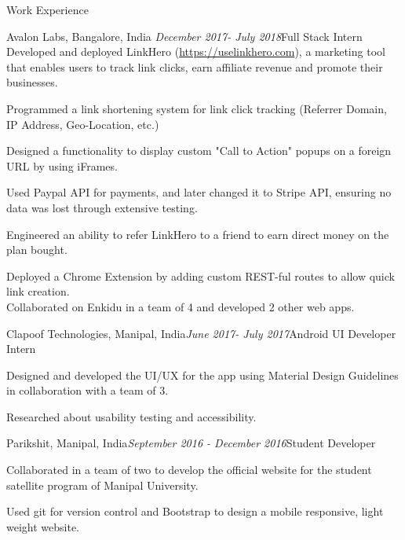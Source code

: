 \documentclass{resume} %
\begin{document}
\begin{rSection}{Work Experience}

    \begin{rSubsection}{Avalon Labs, Bangalore, India }{\em December 2017- July 2018}{Full Stack Intern}{}
    Developed and deployed LinkHero (\url{https://uselinkhero.com}), a marketing tool that enables users to track link clicks, earn affiliate revenue and promote their businesses.
    \item
    Programmed a link shortening system for link click tracking (Referrer Domain, IP Address, Geo-Location, etc.)
    \item 
    Designed a functionality to display custom "Call to Action" popups on a foreign URL by using iFrames.
    \item 
    Used Paypal API for payments, and later changed it to Stripe API, ensuring no data was lost through extensive testing.
    \item 
    Engineered an ability to refer LinkHero to a friend to earn direct money on the plan bought. 
    \item
    Deployed a Chrome Extension by adding custom REST-ful routes to allow quick link creation.\\
    Collaborated on Enkidu in a team of 4 and developed 2 other web apps.
    \end{rSubsection}
    
    \begin{rSubsection}{Clapoof Technologies, Manipal, India}{\em June 2017- July 2017}{Android UI Developer Intern}{}
    \item Designed and developed the UI/UX for the app using Material Design Guidelines in collaboration with a team of 3.
    \item Researched about usability testing and accessibility.
    \end{rSubsection}
    
    \begin{rSubsection}{Parikshit, Manipal, India}{\em September 2016 - December 2016}{Student Developer}{}
    \item Collaborated in a team of two to develop the official website for the student satellite program of Manipal University.
    \item Used git for version control and Bootstrap to design a mobile responsive, light weight website. 
    \end{rSubsection}
\end{rSection}
\end{document}
